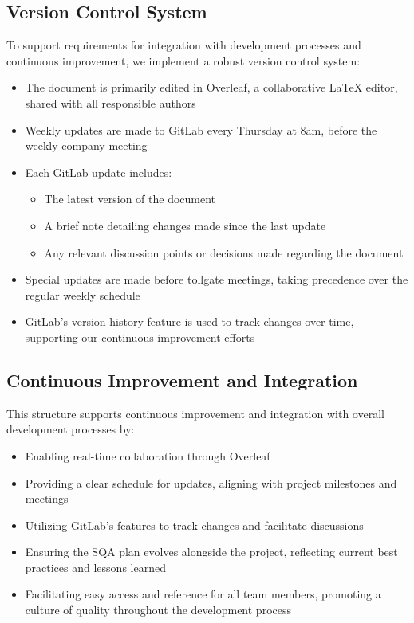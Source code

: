 \documentclass{article}
\begin{document}
\subsection{Version Control System}
To support requirements for integration with development processes and continuous improvement, we implement a robust version control system:

\begin{itemize}
    \item The document is primarily edited in Overleaf, a collaborative LaTeX editor, shared with all responsible authors
    \item Weekly updates are made to GitLab every Thursday at 8am, before the weekly company meeting
    \item Each GitLab update includes:
    \begin{itemize}
        \item The latest version of the document
        \item A brief note detailing changes made since the last update
        \item Any relevant discussion points or decisions made regarding the document
    \end{itemize}
    \item Special updates are made before tollgate meetings, taking precedence over the regular weekly schedule
    \item GitLab's version history feature is used to track changes over time, supporting our continuous improvement efforts
\end{itemize}

\subsection{Continuous Improvement and Integration}
This structure supports continuous improvement and integration with overall development processes by:

\begin{itemize}
    \item Enabling real-time collaboration through Overleaf
    \item Providing a clear schedule for updates, aligning with project milestones and meetings
    \item Utilizing GitLab's features to track changes and facilitate discussions
    \item Ensuring the SQA plan evolves alongside the project, reflecting current best practices and lessons learned
    \item Facilitating easy access and reference for all team members, promoting a culture of quality throughout the development process
\end{itemize}
\end{document}
